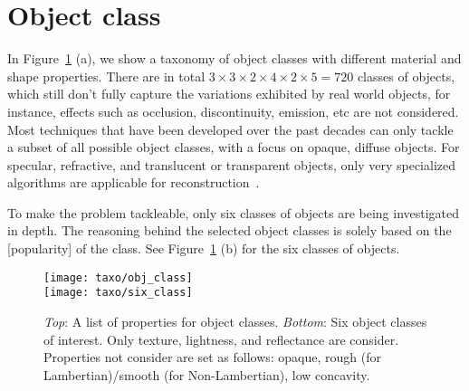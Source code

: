 \section{Object class}
In Figure~\ref{fig:obj_class} (a), we show a taxonomy of object classes with different material and shape properties. There are in total $3\times 3\times 2\times4\times 2\times 5 = 720$ classes of objects, which still don't fully capture the variations exhibited by real world objects, for instance, effects such as occlusion, discontinuity, emission, etc are not considered. Most techniques that have been developed over the past decades can only tackle a subset of all possible object classes, with a focus on opaque, diffuse objects. For specular, refractive, and translucent or transparent objects, only very specialized algorithms are applicable for reconstruction~\cite{ihrke2010transparent}.

To make the problem tackleable, only six classes of objects are being investigated in depth. The reasoning behind the selected object classes is solely based on the [popularity] of the class. See Figure~\ref{fig:obj_class} (b) for the six classes of objects.
\begin{figure}[!htbp]
\centering
\texttt{[image: taxo/obj\_class]}\\
\texttt{[image: taxo/six\_class]}\\
\caption{\textit{Top}: A list of properties for object classes. \textit{Bottom}: Six object classes of interest. Only texture, lightness, and reflectance are consider. Properties not consider are set as follows: opaque, rough (for Lambertian)/smooth (for Non-Lambertian), low concavity.}
\label{fig:obj_class}
\end{figure}

